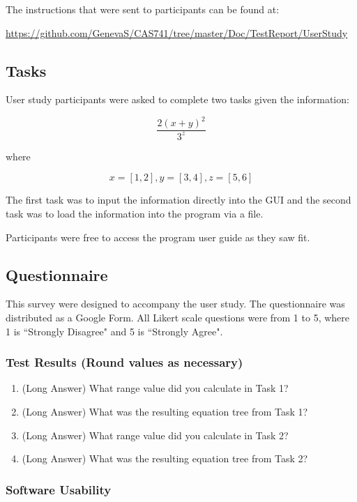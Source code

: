 \documentclass[12pt, titlepage]{article}
\begin{document}
The instructions that were sent to participants can be found at: 

\begin{center}
	\href{https://github.com/GenevaS/CAS741/tree/master/Doc/TestReport/UserStudy}{https://github.com/GenevaS/CAS741/tree/master/Doc/TestReport/UserStudy}
\end{center}

\subsection{Tasks}
User study participants were asked to complete two tasks given the information: 

$$\frac{2(x + y)^2}{3^z}$$

where

$$x = [1, 2], y = [3, 4], z = [5, 6]$$

The first task was to input the information directly into the GUI and the 
second task was to load the information into the program via a file.

Participants were free to access the program user guide as they saw fit. 

\subsection{Questionnaire}
This survey were designed to accompany the user study. The questionnaire was 
distributed as a Google Form. All Likert scale questions were from 1 to 5, 
where 1 is ``Strongly Disagree" and 5 is ``Strongly Agree".

\subsubsection{Test Results (Round values as necessary)}
\begin{enumerate}
	\item (Long Answer) What range value did you calculate in Task 1?
	\item (Long Answer) What was the resulting equation tree from Task 1?
	\item (Long Answer) What range value did you calculate in Task 2?
	\item (Long Answer) What was the resulting equation tree from Task 2?
\end{enumerate}

\subsubsection{Software Usability}
\end{document}
